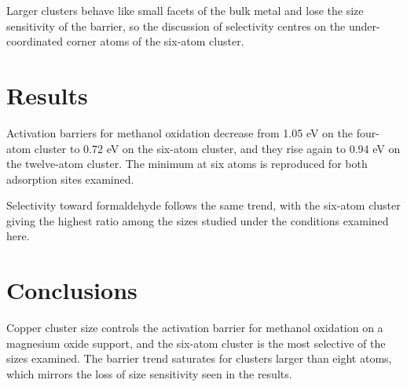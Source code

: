 \documentclass[12pt]{article}
\begin{document}
Larger clusters behave like small facets of the bulk metal and lose the size sensitivity of the
barrier, so the discussion of selectivity centres on the under-coordinated corner atoms of the
six-atom cluster.

\section{Results}

Activation barriers for methanol oxidation decrease from 1.05 eV on the four-atom cluster to
0.72 eV on the six-atom cluster, and they rise again to 0.94 eV on the twelve-atom cluster.
The minimum at six atoms is reproduced for both adsorption sites examined.

Selectivity toward formaldehyde follows the same trend, with the six-atom cluster giving the
highest ratio among the sizes studied under the conditions examined here.

\section{Conclusions}

Copper cluster size controls the activation barrier for methanol oxidation on a magnesium oxide
support, and the six-atom cluster is the most selective of the sizes examined. The barrier
trend saturates for clusters larger than eight atoms, which mirrors the loss of size sensitivity
seen in the results.
\end{document}
